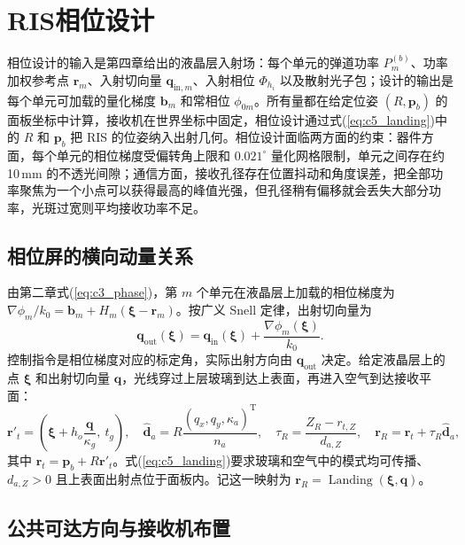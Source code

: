 \section{RIS相位设计}
\label{sec:c3_phase}

相位设计的输入是第四章给出的液晶层入射场：每个单元的弹道功率 $P_m^{(b)}$、功率加权参考点 $\mathbf r_m$、入射切向量 $\mathbf q_{\mathrm{in},m}$、入射相位 $\Phi_{h_i}$ 以及散射光子包；设计的输出是每个单元可加载的量化梯度 $\mathbf b_m$ 和常相位 $\phi_{0m}$。所有量都在给定位姿 $(R,\mathbf p_b)$ 的面板坐标中计算，接收机在世界坐标中固定，相位设计通过式(\ref{eq:c5_landing})中的 $R$ 和 $\mathbf p_b$ 把 RIS 的位姿纳入出射几何。相位设计面临两方面的约束：器件方面，每个单元的相位梯度受偏转角上限和 $0.021^\circ$ 量化网格限制，单元之间存在约 10\,mm 的不透光间隙；通信方面，接收孔径存在位置抖动和角度误差，把全部功率聚焦为一个小点可以获得最高的峰值光强，但孔径稍有偏移就会丢失大部分功率，光斑过宽则平均接收功率不足。

\subsection{相位屏的横向动量关系}

由第二章式(\ref{eq:c3_phase})，第 $m$ 个单元在液晶层上加载的相位梯度为 $\nabla\phi_m/k_0=\mathbf b_m+H_m(\boldsymbol\xi-\mathbf r_m)$。按广义 Snell 定律，出射切向量为
\begin{equation}
\mathbf q_{\mathrm{out}}(\boldsymbol\xi)=\mathbf q_{\mathrm{in}}(\boldsymbol\xi)+\frac{\nabla\phi_m(\boldsymbol\xi)}{k_0}.
\label{eq:c5_momentum}
\end{equation}
控制指令是相位梯度对应的标定角，实际出射方向由 $\mathbf q_{\mathrm{out}}$ 决定。给定液晶层上的点 $\boldsymbol\xi$ 和出射切向量 $\mathbf q$，光线穿过上层玻璃到达上表面，再进入空气到达接收平面：
\begin{equation}
\mathbf r'_t=\left(\boldsymbol\xi+h_o\frac{\mathbf q}{\kappa_g},\ t_g\right),\quad
\hat{\mathbf d}_a=R\frac{(q_x,q_y,\kappa_a)^{\mathrm T}}{n_a},\quad
\tau_R=\frac{Z_R-r_{t,Z}}{d_{a,Z}},\quad
\mathbf r_R=\mathbf r_t+\tau_R\hat{\mathbf d}_a,
\label{eq:c5_landing}
\end{equation}
其中 $\mathbf r_t=\mathbf p_b+R\mathbf r'_t$。式(\ref{eq:c5_landing})要求玻璃和空气中的模式均可传播、$d_{a,Z}>0$ 且上表面出射点位于面板内。记这一映射为 $\mathbf r_R=\operatorname{Landing}(\boldsymbol\xi,\mathbf q)$。

\subsection{公共可达方向与接收机布置}

